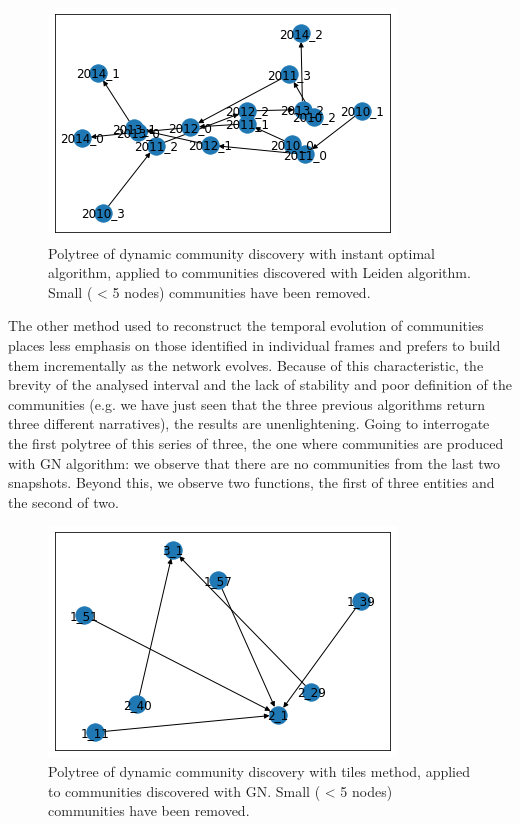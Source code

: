 \documentclass[sigchi]{acmart}
\begin{document}
\begin{figure}[H]
	\centering
	\includegraphics[width=\linewidth]{polyt lei removed.png}
	\caption{Polytree of dynamic community discovery with instant optimal algorithm, applied to communities discovered with Leiden algorithm. Small ( < 5 nodes) communities have been removed.}
\end{figure}	
	
The other method used to reconstruct the temporal evolution of communities places less emphasis on those identified in individual frames and prefers to build them incrementally as the network evolves.
Because of this characteristic, the brevity of the analysed interval and the lack of stability and poor definition of the communities (e.g. we have just seen that the three previous algorithms return three different narratives), the results are unenlightening.
\newline
Going to interrogate the first polytree of this series of three, the one where communities are produced with GN algorithm: we observe that there are no communities from the last two snapshots. Beyond this, we observe two functions, the first of three entities and the second of two.
	
\begin{figure}[H]
	\centering
	\includegraphics[width=\linewidth]{polyt GN tiles.png}
	\caption{Polytree of dynamic community discovery with tiles method, applied to communities discovered with GN. Small ( < 5 nodes) communities have been removed.}
\end{figure}
\end{document}
